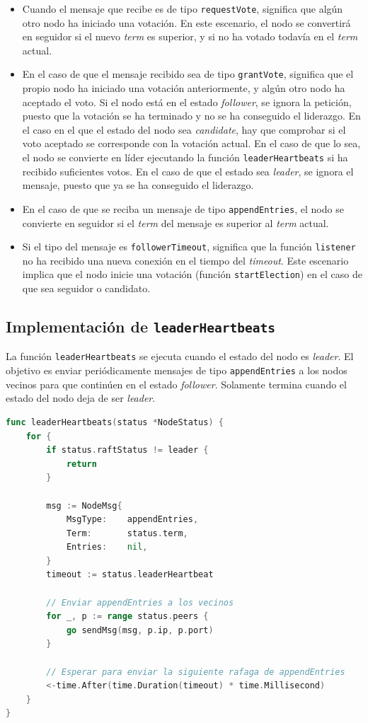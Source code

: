 \begin{itemize}
\item Cuando el mensaje que recibe es de tipo \texttt{requestVote}, significa que algún otro nodo ha iniciado una votación. En este escenario, el nodo se convertirá en seguidor si el nuevo \textit{term} es superior, y si no ha votado todavía en el \textit{term} actual.

\item En el caso de que el mensaje recibido sea de tipo \texttt{grantVote}, significa que el propio nodo ha iniciado una votación anteriormente, y algún otro nodo ha aceptado el voto. Si el nodo está en el estado \textit{follower}, se ignora la petición, puesto que la votación se ha terminado y no se ha conseguido el liderazgo. En el caso en el que el estado del nodo sea \textit{candidate}, hay que comprobar si el voto aceptado se corresponde con la votación actual. En el caso de que lo sea, el nodo se convierte en líder ejecutando la función \texttt{leaderHeartbeats} si ha recibido suficientes votos. En el caso de que el estado sea \textit{leader}, se ignora el mensaje, puesto que ya se ha conseguido el liderazgo.

\item En el caso de que se reciba un mensaje de tipo \texttt{appendEntries}, el nodo se convierte en seguidor si el \textit{term} del mensaje es superior al \textit{term} actual.

\item Si el tipo del mensaje es \texttt{followerTimeout}, significa que la función \texttt{listener} no ha recibido una nueva conexión en el tiempo del \textit{timeout}. Este escenario implica que el nodo inicie una votación (función \texttt{startElection}) en el caso de que sea seguidor o candidato.
\end{itemize}

\subsection{Implementación de \texttt{leaderHeartbeats}}

La función \texttt{leaderHeartbeats} se ejecuta cuando el estado del nodo es \textit{leader}. El objetivo es enviar periódicamente mensajes de tipo \texttt{appendEntries} a los nodos vecinos para que continúen en el estado \textit{follower}. Solamente termina cuando el estado del nodo deja de ser \textit{leader}. 

\begin{lstlisting}[language=go]
func leaderHeartbeats(status *NodeStatus) {
	for {
		if status.raftStatus != leader {
			return
		}

		msg := NodeMsg{
			MsgType:    appendEntries,
			Term:       status.term,
			Entries:    nil,
		}
		timeout := status.leaderHeartbeat
		
		// Enviar appendEntries a los vecinos
		for _, p := range status.peers {
			go sendMsg(msg, p.ip, p.port)
		}

		// Esperar para enviar la siguiente rafaga de appendEntries
		<-time.After(time.Duration(timeout) * time.Millisecond)
	}
}
\end{lstlisting}

